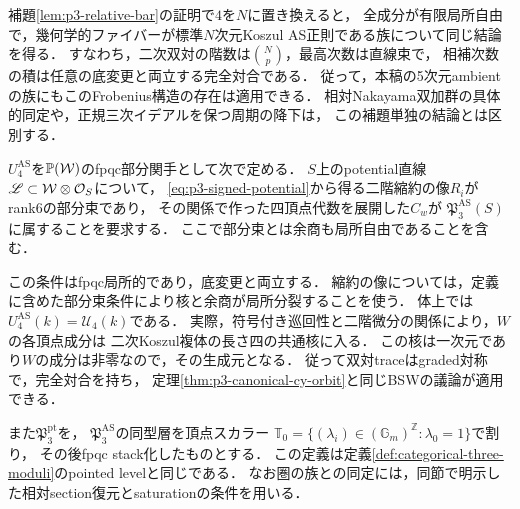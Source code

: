 \begin{remark}[相対bar補題の次元に依存しない部分]
\label{rem:relative-bar-general-dimension}
補題\ref{lem:p3-relative-bar}の証明で$4$を$N$に置き換えると，
全成分が有限局所自由で，幾何学的ファイバーが標準$N$次元Koszul
AS正則である族について同じ結論を得る．
すなわち，二次双対の階数は$\binom Np$，最高次数は直線束で，
相補次数の積は任意の底変更と両立する完全対合である．
従って，本稿の5次元ambientの族にもこのFrobenius構造の存在は適用できる．
相対Nakayama双加群の具体的同定や，正規三次イデアルを保つ周期の降下は，
この補題単独の結論とは区別する．
\end{remark}

\begin{definition}[相対許容potential関手]
\label{def:p3-relative-potential-functor}
$U_4^{\mathrm{AS}}$を$\mathbb P(\mathcal W)$のfpqc部分関手として次で定める．
$S$上のpotential直線$\mathscr L\subset\mathcal W\otimes\mathcal O_S$について，
\eqref{eq:p3-signed-potential}から得る二階縮約の像$R_i$がrank6の部分束であり，
その関係で作った四頂点代数を展開した$C_w$が
$\mathfrak P_3^{\mathrm{AS}}(S)$に属することを要求する．
ここで部分束とは余商も局所自由であることを含む．
\end{definition}

この条件はfpqc局所的であり，底変更と両立する．
縮約の像については，定義に含めた部分束条件により核と余商が局所分裂することを使う．
体上では$U_4^{\mathrm{AS}}(k)=\mathcal U_4(k)$である．
実際，符号付き巡回性と二階微分の関係により，$W$の各頂点成分は
二次Koszul複体の長さ四の共通核に入る．
この核は一次元であり$W$の成分は非零なので，その生成元となる．
従って双対traceはgraded対称で，完全対合を持ち，
定理\ref{thm:p3-canonical-cy-orbit}と同じBSWの議論が適用できる．

また$\mathfrak P_3^{\mathrm{pt}}$を，
$\mathfrak P_3^{\mathrm{AS}}$の同型層を頂点スカラー
$\mathbb T_0=\{(\lambda_i)\in(\mathbb G_m)^{\mathbb Z}:\lambda_0=1\}$で割り，
その後fpqc stack化したものとする．
この定義は定義\ref{def:categorical-three-moduli}のpointed levelと同じである．
なお圏の族との同定には，同節で明示した相対section復元とsaturationの条件を用いる．

